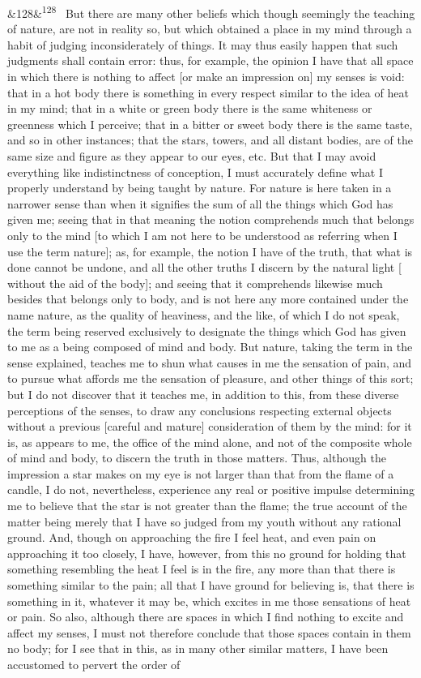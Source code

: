 \documentclass[12pt]{article}
\newcommand{\para}[1][]{\par\noindent\ifx&#1&\else\textsuperscript{\footnotesize #1}~\fi}
\begin{document}
\para[128] But there are many other beliefs which though seemingly the teaching of nature, are not in reality so, but which obtained a place in my mind through a habit of judging inconsiderately of things. It may thus easily happen that such judgments shall contain error: thus, for example, the opinion I have that all space in which there is nothing to affect [or make an impression on] my senses is void: that in a hot body there is something in every respect similar to the idea of heat in my mind; that in a white or green body there is the same whiteness or greenness which I perceive; that in a bitter or sweet body there is the same taste, and so in other instances; that the stars, towers, and all distant bodies, are of the same size and figure as they appear to our eyes, etc. But that I may avoid everything like indistinctness of conception, I must accurately define what I properly understand by being taught by nature. For nature is here taken in a narrower sense than when it signifies the sum of all the things which God has given me; seeing that in that meaning the notion comprehends much that belongs only to the mind [to which I am not here to be understood as referring when I use the term nature]; as, for example, the notion I have of the truth, that what is done cannot be undone, and all the other truths I discern by the natural light [ without the aid of the body]; and seeing that it comprehends likewise much besides that belongs only to body, and is not here any more contained under the name nature, as the quality of heaviness, and the like, of which I do not speak, the term being reserved exclusively to designate the things which God has given to me as a being composed of mind and body. But nature, taking the term in the sense explained, teaches me to shun what causes in me the sensation of pain, and to pursue what affords me the sensation of pleasure, and other things of this sort; but I do not discover that it teaches me, in addition to this, from these diverse perceptions of the senses, to draw any conclusions respecting external objects without a previous [careful and mature] consideration of them by the mind: for it is, as appears to me, the office of the mind alone, and not of the composite whole of mind and body, to discern the truth in those matters. Thus, although the impression a star makes on my eye is not larger than that from the flame of a candle, I do not, nevertheless, experience any real or positive impulse determining me to believe that the star is not greater than the flame; the true account of the matter being merely that I have so judged from my youth without any rational ground. And, though on approaching the fire I feel heat, and even pain on approaching it too closely, I have, however, from this no ground for holding that something resembling the heat I feel is in the fire, any more than that there is something similar to the pain; all that I have ground for believing is, that there is something in it, whatever it may be, which excites in me those sensations of heat or pain. So also, although there are spaces in which I find nothing to excite and affect my senses, I must not therefore conclude that those spaces contain in them no body; for I see that in this, as in many other similar matters, I have been accustomed to pervert the order of 
\end{document}
